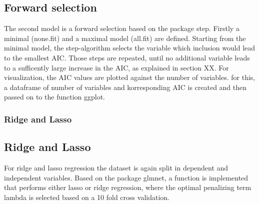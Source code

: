 \subsection{Forward selection}
The second model is a forward selection based on the package step. Firstly a minimal (none.fit) and a maximal model (all.fit) are defined. Starting from the minimal model, the step-algorithm selects the variable which inclusion would lead to the smallest AIC. Those steps are repeated, until no additional variable leads to a sufficently large increase in the AIC, as explained in section XX. 
For visualization, the AIC values are plotted against the number of variables. for this, a dataframe of number of variables and korresponding AIC is created and then passed on to the function ggplot.

\subsubsection{Ridge and Lasso}
\subsection{Ridge and Lasso}
For ridge and lasso regression the dataset is again split in dependent
and independent variables. Based on the package glmnet, a function is implemented 
that performs either lasso or ridge regression, where the optimal
penalizing term lambda is selected based on a 10 fold cross validation.

